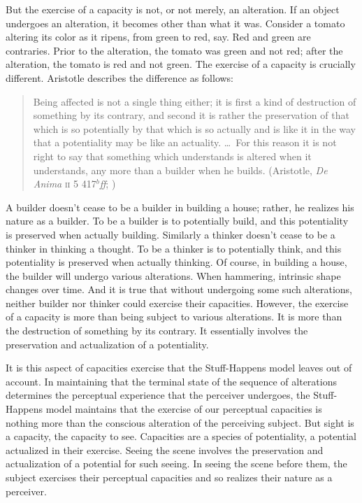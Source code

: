 \documentclass[12pt]{article}
\begin{document}
But the exercise of a capacity is not, or not merely, an alteration. If an object undergoes an alteration, it becomes other than what it was. Consider a tomato altering its color as it ripens, from green to red, say. Red and green are contraries. Prior to the alteration, the tomato was green and not red; after the alteration, the tomato is red and not green. The exercise of a capacity is crucially different. Aristotle describes the difference as follows:
\begin{quote}
    Being affected is not a single thing either; it is first a kind of destruction of something by its contrary, and second it is rather the preservation of that which is so potentially by that which is so actually and is like it in the way that a potentiality may be like an actuality. \ldots\ For this reason it is not right to say that something which understands is altered when it understands, any more than a builder when he builds. (Aristotle, \emph{De Anima} \textsc{ii} 5 417\( ^{b} \)\emph{ff}; \citealt[23--24]{Hamlyn:2002ys})
\end{quote}
A builder doesn't cease to be a builder in building a house; rather, he realizes his nature as a builder. To be a builder is to potentially build, and this potentiality is preserved when actually building. Similarly a thinker doesn't cease to be a thinker in thinking a thought. To be a thinker is to potentially think, and this potentiality is preserved when actually thinking.  Of course, in building a house, the builder will undergo various alterations. When hammering, intrinsic shape changes over time. And it is true that without undergoing some such alterations, neither builder nor thinker could exercise their capacities. However, the exercise of a capacity is more than being subject to various alterations. It is more than the destruction of something by its contrary. It essentially involves the preservation and actualization of a potentiality.

It is this aspect of capacities exercise that the Stuff-Happens model leaves out of account. In maintaining that the terminal state of the sequence of alterations determines the perceptual experience that the perceiver undergoes, the Stuff-Happens model maintains that the exercise of our perceptual capacities is nothing more than the conscious alteration of the perceiving subject. But sight is a capacity, the capacity to see. Capacities are a species of potentiality, a potential actualized in their exercise. Seeing the scene involves the preservation and actualization of a potential for such seeing. In seeing the scene before them, the subject exercises their perceptual capacities and so realizes their nature as a perceiver.
\end{document}
